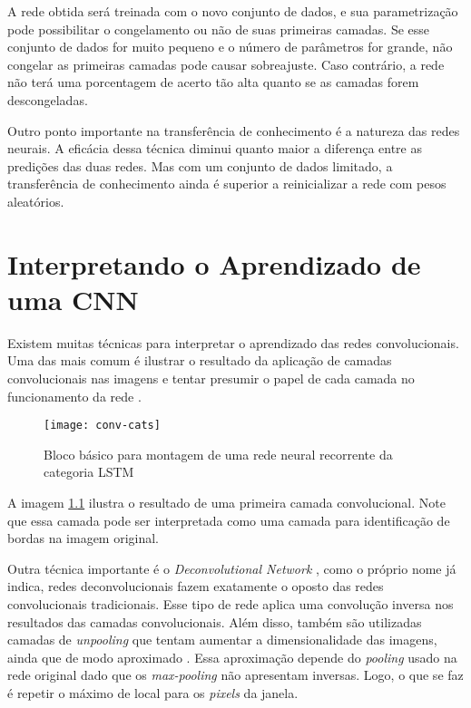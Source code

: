 A rede obtida será treinada com o novo conjunto de dados, e sua parametrização pode possibilitar o congelamento ou não de suas primeiras camadas. Se esse conjunto de dados for muito pequeno e o número de parâmetros for grande, não congelar as primeiras camadas pode causar sobreajuste. Caso contrário, a rede não terá uma porcentagem de acerto tão alta quanto se as camadas forem descongeladas.


Outro ponto importante na transferência de conhecimento é a natureza das redes neurais. A eficácia dessa técnica diminui quanto maior a diferença entre as predições das duas redes. Mas com um conjunto de dados limitado, a transferência de conhecimento ainda é superior a reinicializar a rede com pesos aleatórios.

\chapter{Interpretando o Aprendizado de uma CNN}

Existem muitas técnicas para interpretar o aprendizado das redes convolucionais. Uma das mais comum é ilustrar o resultado da aplicação de camadas convolucionais nas imagens e tentar presumir o papel de cada camada no funcionamento da rede \cite{chollet2017deep}.

\begin{figure}[ht]
    \caption{Bloco básico para montagem de uma rede neural recorrente da categoria LSTM}
    \texttt{[image: conv-cats]}
    \centering
    \label{fig2}
\end{figure}

A imagem \ref{fig2} ilustra o resultado de uma primeira camada convolucional. Note que essa camada pode ser interpretada como uma camada para identificação de bordas na imagem original.

Outra técnica importante é o \textit{Deconvolutional Network} \cite{zeiler2014visualizing}, como o próprio nome já indica, redes deconvolucionais fazem exatamente o oposto das redes convolucionais tradicionais. Esse tipo de rede aplica uma convolução inversa nos resultados das camadas convolucionais. Além disso, também são utilizadas camadas de \textit{unpooling} que tentam aumentar a dimensionalidade das imagens, ainda que de modo aproximado \cite{zeiler2014visualizing}. Essa aproximação depende do \textit{pooling} usado na rede original dado que os \textit{max-pooling} não apresentam inversas. Logo, o que se faz é repetir o máximo de local para os \textit{pixels} da janela.

